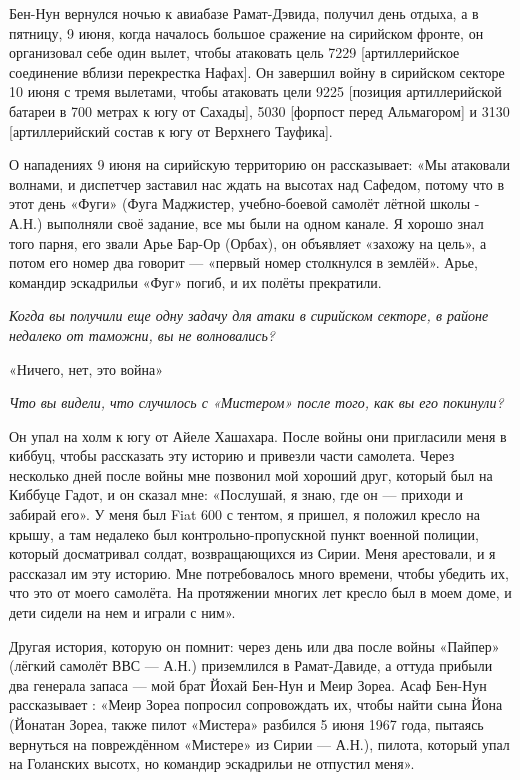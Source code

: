 Бен-Нун вернулся ночью к авиабазе Рамат-Дэвида, получил день отдыха, а в пятницу, 9 июня, когда началось большое сражение на сирийском фронте, он организовал себе один вылет, чтобы атаковать цель 7229 [артиллерийское соединение вблизи перекрестка Нафах]. Он завершил войну в сирийском секторе 10 июня с тремя вылетами, чтобы атаковать цели 9225 [позиция артиллерийской батареи в 700 метрах к югу от Сахады], 5030 [форпост перед Альмагором] и 3130 [артиллерийский состав к югу от Верхнего Тауфика].

О нападениях 9 июня на сирийскую территорию он рассказывает: «Мы атаковали волнами, и диспетчер заставил нас ждать на высотах над Сафедом, потому что в этот день «Фуги» (Фуга Маджистер, учебно-боевой самолёт лётной школы - А.Н.) выполняли своё задание, все мы были на одном канале. Я хорошо знал того парня, его звали Арье Бар-Ор (Орбах), он объявляет «захожу на цель», а потом его номер два говорит — «первый номер столкнулся в землёй». Арье, командир эскадрильи «Фуг» погиб, и их полёты прекратили.

\textit{Когда вы получили еще одну задачу для атаки в сирийском секторе, в районе недалеко от таможни, вы не волновались?}

«Ничего, нет, это война»

\textit{Что вы видели, что случилось с «Мистером» после того, как вы его покинули?}

Он упал на холм к югу от Айеле Хашахара. После войны они пригласили меня в киббуц, чтобы рассказать эту историю и привезли части самолета. Через несколько дней после войны мне позвонил мой хороший друг, который был на Киббуце Гадот, и он сказал мне: «Послушай, я знаю, где он — приходи и забирай его». У меня был Fiat 600 с тентом, я пришел, я положил кресло на крышу, а там недалеко был контрольно-пропускной пункт военной полиции, который досматривал солдат, возвращающихся из Сирии. Меня арестовали, и я рассказал им эту историю. Мне потребовалось много времени, чтобы убедить их, что это от моего самолёта. На протяжении многих лет кресло был в моем доме, и дети сидели на нем и играли с ним».

Другая история, которую он помнит: через день или два после войны «Пайпер» (лёгкий самолёт ВВС — А.Н.) приземлился в Рамат-Давиде, а оттуда прибыли два генерала запаса — мой брат Йохай Бен-Нун и Меир Зореа. Асаф Бен-Нун рассказывает : «Меир Зореа попросил сопровождать их, чтобы найти сына Йона (Йонатан Зореа, также пилот «Мистера» разбился 5 июня 1967 года, пытаясь вернуться на повреждённом «Мистере» из Сирии — А.Н.), пилота, который упал на Голанских высотх, но командир эскадрильи не отпустил меня».


